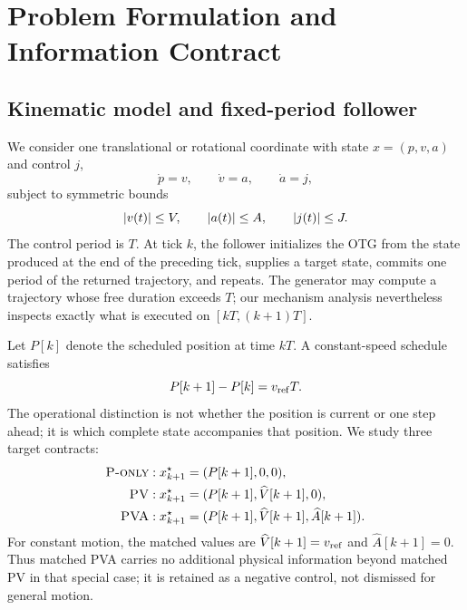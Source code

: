\section{Problem Formulation and Information Contract}
\label{sec:problem}

\subsection{Kinematic model and fixed-period follower}

We consider one translational or rotational coordinate with state $x=(p,v,a)$ and control $j$,
\begin{equation}
 \dot p=v,\qquad \dot v=a,\qquad \dot a=j,
 \label{eq:third-order}
\end{equation}
subject to symmetric bounds
\begin{equation}
 \lvert v(t)\rvert\le V,\qquad \lvert a(t)\rvert\le A,\qquad \lvert j(t)\rvert\le J.
 \label{eq:bounds}
\end{equation}
The control period is $T$. At tick $k$, the follower initializes the OTG from the state produced at the end of the preceding tick, supplies a target state, commits one period of the returned trajectory, and repeats. The generator may compute a trajectory whose free duration exceeds $T$; our mechanism analysis nevertheless inspects exactly what is executed on $[kT,(k+1)T]$.

Let $P[k]$ denote the scheduled position at time $kT$. A constant-speed schedule satisfies
\begin{equation}
 P[k+1]-P[k]=v_{\mathrm{ref}} T.
 \label{eq:constant-schedule}
\end{equation}
The operational distinction is not whether the position is current or one step ahead; it is which complete state accompanies that position. We study three target contracts:
\begin{align}
 \textsc{P-only} &: x^{\star}_{k+1}=(P[k+1],0,0), \label{eq:p-contract}\\
 \textsc{PV} &: x^{\star}_{k+1}=(P[k+1],\widehat V[k+1],0), \label{eq:pv-contract}\\
 \textsc{PVA} &: x^{\star}_{k+1}=(P[k+1],\widehat V[k+1],\widehat A[k+1]). \label{eq:pva-contract}
\end{align}
For constant motion, the matched values are $\widehat V[k+1]=v_{\mathrm{ref}}$ and $\widehat A[k+1]=0$. Thus matched PVA carries no additional physical information beyond matched PV in that special case; it is retained as a negative control, not dismissed for general motion.

